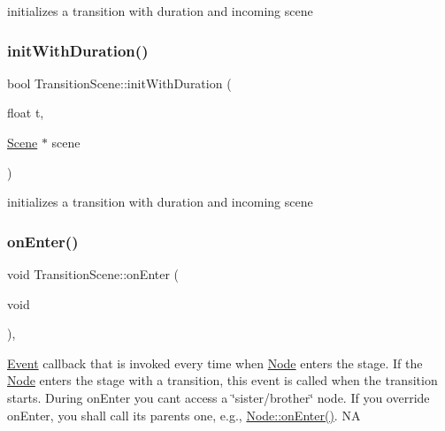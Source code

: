 initializes a transition with duration and incoming scene \mbox{\label{classTransitionScene_a8d74011248967a549d855d95056d5db6}} 
\subsubsection{\texorpdfstring{init\+With\+Duration()}{initWithDuration()}\hspace{0.1cm}{\footnotesize\ttfamily [2/2]}}
{\footnotesize\ttfamily bool Transition\+Scene\+::init\+With\+Duration (\begin{DoxyParamCaption}\item[{float}]{t,  }\item[{\hyperlink{classScene}{Scene} $\ast$}]{scene }\end{DoxyParamCaption})}

initializes a transition with duration and incoming scene \mbox{\label{classTransitionScene_aace390a1bd8f3c73bb650a1e256a0f83}} 
\subsubsection{\texorpdfstring{on\+Enter()}{onEnter()}\hspace{0.1cm}{\footnotesize\ttfamily [1/2]}}
{\footnotesize\ttfamily void Transition\+Scene\+::on\+Enter (\begin{DoxyParamCaption}\item[{void}]{ }\end{DoxyParamCaption})\hspace{0.3cm}{\ttfamily [override]}, {\ttfamily [virtual]}}

\hyperlink{classEvent}{Event} callback that is invoked every time when \hyperlink{classNode}{Node} enters the \textquotesingle{}stage\textquotesingle{}. If the \hyperlink{classNode}{Node} enters the \textquotesingle{}stage\textquotesingle{} with a transition, this event is called when the transition starts. During on\+Enter you can\textquotesingle{}t access a \char`\"{}sister/brother\char`\"{} node. If you override on\+Enter, you shall call its parent\textquotesingle{}s one, e.\+g., \hyperlink{classNode_a7f51764c4afd5018a052b9ef71c03374}{Node\+::on\+Enter()}.  NA 

